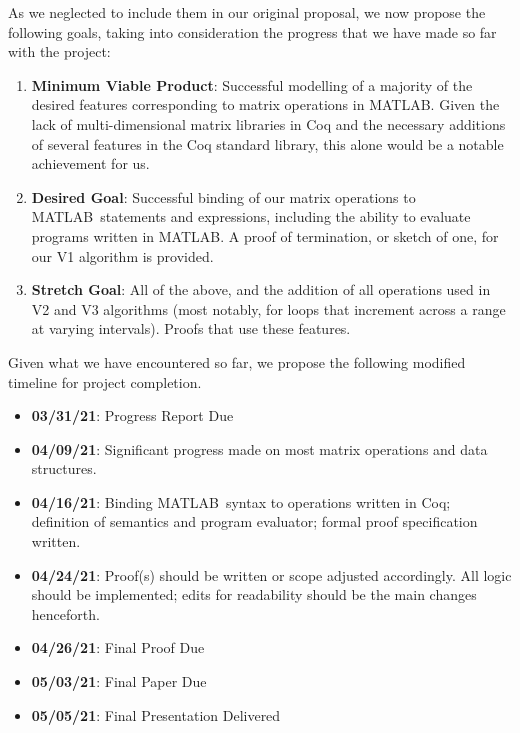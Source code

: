 \documentclass[11pt,conference]{IEEEtran}
\newcommand{\matlab}{MATLAB}
\newcommand{\mmatlab}{\textmu\matlab}
\theoremstyle{plain} %
\theoremstyle{definition}
\theoremstyle{remark}
\begin{document}
As we neglected to include them in our original proposal, we now propose the
following goals, taking into consideration the progress that we have made so far
with the project:

\begin{enumerate}

    \item \textbf{Minimum Viable Product}: Successful modelling of a majority of
        the desired features corresponding to matrix operations in \mmatlab\@.
        Given the lack of multi-dimensional matrix libraries in Coq and the
        necessary additions of several features in the Coq standard library,
        this alone would be a notable achievement for us.

    \item \textbf{Desired Goal}: Successful binding of our matrix operations to
        \mmatlab\ statements and expressions, including the ability to evaluate
        programs written in \mmatlab\@. A proof of termination, or sketch of
        one, for our V1 algorithm is provided.

    \item \textbf{Stretch Goal}: All of the above, and the addition of all
        operations used in V2 and V3 algorithms (most notably, for loops that
        increment across a range at varying intervals). Proofs that use
        these features.

\end{enumerate}

Given what we have encountered so far, we propose the following modified
timeline for project completion.

\begin{itemize}
    \item \textbf{03/31/21}: Progress Report Due
    \item \textbf{04/09/21}: Significant progress made on most matrix operations
        and data structures.
    \item \textbf{04/16/21}: Binding \mmatlab\ syntax to operations written
        in Coq; definition of semantics and program evaluator; formal proof
        specification written.
    \item \textbf{04/24/21}: Proof(s) should be written or scope adjusted
        accordingly. All logic should be implemented; edits for readability
        should be the main changes henceforth.
    \item \textbf{04/26/21}: Final Proof Due
    \item \textbf{05/03/21}: Final Paper Due
    \item \textbf{05/05/21}: Final Presentation Delivered
\end{itemize}
\end{document}
